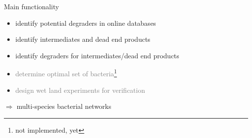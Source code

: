 \documentclass[style=aggie]{powerdot}
\begin{document}
\begin{slide}{Main functionality}
\begin{itemize}
 \item identify potential degraders in online databases
 \item identify intermediates and dead end products
 \item identify degraders for intermediates/dead end products
 \item \textcolor{gray}{determine optimal set of bacteria\footnote{not implemented, yet}}
 \item \textcolor{gray}{design wet land experiments for verification\footnotemark[1]}
\end{itemize}
\indent $\Rightarrow$ multi-species bacterial networks
\end{slide}
\end{document}
